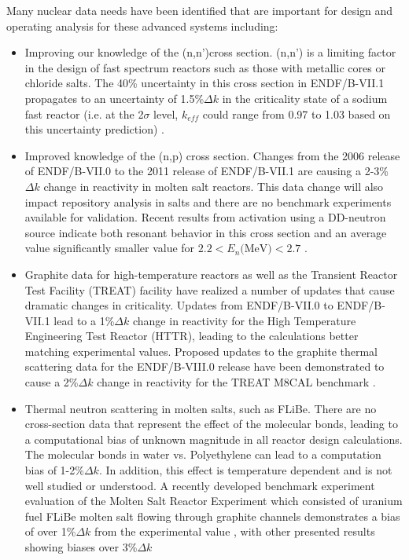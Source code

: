 \documentclass[letterpaper]{ar-1col}
\begin{document}
Many nuclear data needs have been identified that are important for design and operating analysis for these advanced systems including:
\begin{itemize}
  \item Improving our knowledge of the (n,n')cross section.
  (n,n') is a limiting factor in the design of fast spectrum reactors such as those with metallic cores or chloride salts.
The 40\% uncertainty in this cross section in ENDF/B-VII.1 propagates to an uncertainty of 1.5\%$\Delta k$ in the criticality state of a sodium fast reactor (i.e. at the 2$\sigma$ level, $k_{eff}$ could range from 0.97 to 1.03 based on this uncertainty prediction) \cite{touran2016sensitivities}.
  \item Improved knowledge of the (n,p) cross section.
 Changes from the 2006 release of ENDF/B-VII.0 to the 2011 release of ENDF/B-VII.1 are causing a 2-3\%$\Delta k$ change in reactivity in molten salt reactors.
This data change will also impact repository analysis in salts and there are no benchmark experiments available for validation.
Recent results from activation using a DD-neutron source \cite{Voyles2017} indicate both resonant behavior in this cross section and an average value significantly smaller value for  $2.2 < E_n \text{(MeV)} < 2.7$ \cite{Bat18}.  
  \item Graphite data for high-temperature reactors as well as the Transient Reactor Test Facility (TREAT) facility have realized a number of updates that cause dramatic changes in criticality.
Updates from ENDF/B-VII.0 to ENDF/B-VII.1 lead to a 1\%$\Delta k$ change in reactivity for the High Temperature Engineering Test Reactor (HTTR), leading to the calculations better matching experimental values.
Proposed updates to the graphite thermal scattering data for the ENDF/B-VIII.0 release have been demonstrated to cause a 2\%$\Delta k$ change in reactivity for the TREAT M8CAL benchmark \cite{hawarithermal}.
  \item Thermal neutron scattering in molten salts, such as FLiBe.
There are no cross-section data that represent the effect of the molecular bonds, leading to a computational bias of unknown magnitude in all reactor design calculations.
The molecular bonds in water vs. Polyethylene can lead to a computation bias of 1-2\%$\Delta k$.
 In addition, this effect is temperature dependent and is not well studied or understood.
A recently developed benchmark experiment evaluation of the Molten Salt Reactor Experiment which consisted of uranium fuel FLiBe molten salt flowing through graphite channels demonstrates a bias of over 1\%$\Delta k$ from the experimental value \cite{shenzero}, with other presented results showing biases over 3\%$\Delta k$

\end{itemize}
\end{document}
